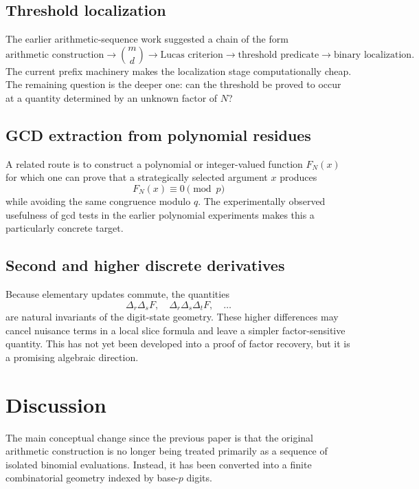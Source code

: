 \documentclass[11pt,a4paper]{article}
\theoremstyle{definition}
\theoremstyle{remark}
\begin{document}
\subsection{Threshold localization}

The earlier arithmetic-sequence work suggested a chain of the form
\[
\text{arithmetic construction}
\rightarrow
\binom{m}{d}
\rightarrow
\text{Lucas criterion}
\rightarrow
\text{threshold predicate}
\rightarrow
\text{binary localization}.
\]
The current prefix machinery makes the localization stage computationally cheap.  The remaining question is the deeper one: can the threshold be proved to occur at a quantity determined by an unknown factor of $N$?

\subsection{GCD extraction from polynomial residues}

A related route is to construct a polynomial or integer-valued function $F_N(x)$ for which one can prove that a strategically selected argument $x$ produces
\[
 F_N(x)\equiv0\pmod p
\]
while avoiding the same congruence modulo $q$.  The experimentally observed usefulness of gcd tests in the earlier polynomial experiments makes this a particularly concrete target.

\subsection{Second and higher discrete derivatives}

Because elementary updates commute, the quantities
\[
 \Delta_r\Delta_sF,
 \quad
 \Delta_r\Delta_s\Delta_tF,
 \quad\ldots
\]
are natural invariants of the digit-state geometry.  These higher differences may cancel nuisance terms in a local slice formula and leave a simpler factor-sensitive quantity.  This has not yet been developed into a proof of factor recovery, but it is a promising algebraic direction.

\section{Discussion}

The main conceptual change since the previous paper is that the original arithmetic construction is no longer being treated primarily as a sequence of isolated binomial evaluations.  Instead, it has been converted into a finite combinatorial geometry indexed by base-$p$ digits.
\end{document}
